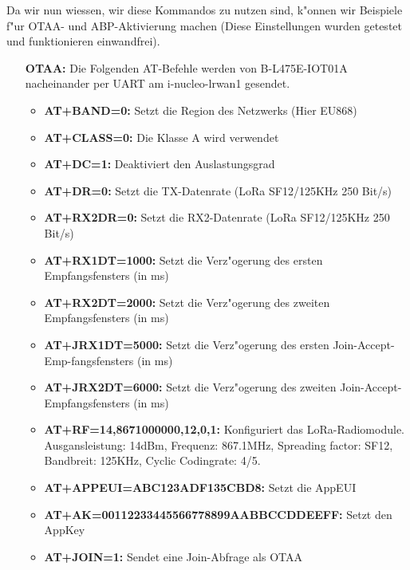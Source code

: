 \vspace{1cm}
Da wir nun wiessen, wir diese Kommandos zu nutzen sind, k"onnen wir 
Beispiele f"ur OTAA- und ABP-Aktivierung machen (Diese Einstellungen wurden getestet
und funktionieren einwandfrei).

\begin{itemize}\label{LoRaconf}
	\item[\textbf{OTAA:}] Die Folgenden AT-Befehle werden von
	B-L475E-IOT01A nacheinander  per UART am i-nucleo-lrwan1 gesendet.
	\begin{itemize}
		\item \textbf{AT+BAND=0:} Setzt die Region des Netzwerks (Hier
		EU868)
		\item \textbf{AT+CLASS=0:} Die Klasse A wird verwendet 
		\item \textbf{AT+DC=1:} Deaktiviert den Auslastungsgrad 
		\item \textbf{AT+DR=0:} Setzt die TX-Datenrate (LoRa SF12/125KHz
		250 Bit/s)
		\item \textbf{AT+RX2DR=0:} Setzt die RX2-Datenrate (LoRa
		SF12/125KHz 250 Bit/s)
		\item \textbf{AT+RX1DT=1000:} Setzt die Verz"ogerung des ersten
		Empfangsfensters (in ms)
		\item \textbf{AT+RX2DT=2000:} Setzt die Verz"ogerung des zweiten
		Empfangsfensters (in ms)
		\item \textbf{AT+JRX1DT=5000:} Setzt die Verz"ogerung des
		ersten Join-Accept-Emp-fangsfensters (in ms)
		\item \textbf{AT+JRX2DT=6000:} Setzt die Verz"ogerung des
		zweiten Join-Accept-Empfangsfensters (in ms)
		\item \textbf{AT+RF=14,8671000000,12,0,1:} Konfiguriert das
		LoRa-Radiomodule. Ausgansleistung: 14dBm, Frequenz: 867.1MHz,
		Spreading factor: SF12, Bandbreit: 125KHz, Cyclic Codingrate:
		4/5.  
		\item \textbf{AT+APPEUI=ABC123ADF135CBD8:} Setzt die AppEUI
		\item \textbf{AT+AK=00112233445566778899AABBCCDDEEFF:} Setzt den
		AppKey 
		\item \textbf{AT+JOIN=1:} Sendet eine Join-Abfrage als OTAA
		 
	\end{itemize}
	

\end{itemize}
